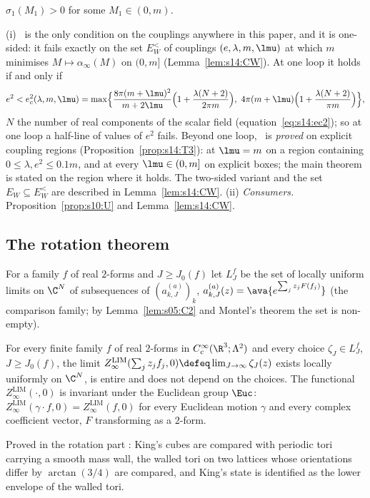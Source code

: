 \begin{hypothesis}\label{hyp:s03:T3}
$\sigma_1(M_1)>0$ for some $M_1\in(0,m)$.
\end{hypothesis}

\begin{remark}[on \Tthree]\label{rem:s03:T3}
(i) \Tthree\ is the only condition on the couplings anywhere in this paper, and it is one-sided: it fails exactly on the set $E^<_W$ of couplings $(e,\lambda,m,\lmu)$ at which $m$ minimises $M\mapsto\alpha_\infty(M)$ on $(0,m]$ (Lemma~\ref{lem:s14:CW}). At one loop it holds if and only if
\[
e^2<e_c^2(\lambda,m,\lmu)=\max\Bigl\{\frac{8\pi(m+\lmu)^2}{m+2\lmu}\Bigl(1+\frac{\lambda(N+2)}{2\pi m}\Bigr),\ 4\pi(m+\lmu)\Bigl(1+\frac{\lambda(N+2)}{\pi m}\Bigr)\Bigr\},
\]
$N$ the number of real components of the scalar field (equation~\eqref{eq:s14:ec2}); so at one loop a half-line of values of $e^2$ fails. Beyond one loop, \Tthree\ is \emph{proved} on explicit coupling regions (Proposition~\ref{prop:s14:T3}): at $\lmu=m$ on a region containing $0\le\lambda,e^2\le0.1m$, and at every $\lmu\in(0,m]$ on explicit boxes; the main theorem is stated on the region where it holds. The two-sided variant and the set $E_W\subseteq E^<_W$ are described in Lemma~\ref{lem:s14:CW}.
(ii) \emph{Consumers.} Proposition~\ref{prop:s10:U} and Lemma~\ref{lem:s14:CW}.
\end{remark}

\subsection{The rotation theorem}

For a family $f$ of real $2$-forms and $J\ge J_0(f)$ let $L^f_J$ be the set of locally uniform limits on $\C^N$ of subsequences of $(a^{(a)}_{k,J})_k$, $a^{(a)}_{k,J}(z)=\ava{e^{\sum_jz_jF(f_j)}}$ (the comparison family; by Lemma~\ref{lem:s05:C2} and Montel's theorem the set is non-empty).

\begin{theorem}\label{hyp:s03:RC}
For every finite family $f$ of real $2$-forms in $C^\infty_c(\R^3;\Lambda^2)$ and every choice $\zeta_J\in L^f_J$, $J\ge J_0(f)$, the limit $Z^{\mathrm{LIM}}_\infty(\sum_jz_jf_j,0)\defeq\lim_{J\to\infty}\zeta_J(z)$ exists locally uniformly on $\C^N$, is entire and does not depend on the choices. The functional $Z^{\mathrm{LIM}}_\infty(\cdot,0)$ is invariant under the Euclidean group $\Euc$: $Z^{\mathrm{LIM}}_\infty(\gamma\cdot f,0)=Z^{\mathrm{LIM}}_\infty(f,0)$ for every Euclidean motion $\gamma$ and every complex coefficient vector, $F$ transforming as a $2$-form.
\end{theorem}
Proved in the rotation part : King's cubes are compared with periodic tori carrying a smooth mass wall, the walled tori on two lattices whose orientations differ by $\arctan(3/4)$ are compared, and King's state is identified as the lower envelope of the walled tori.

